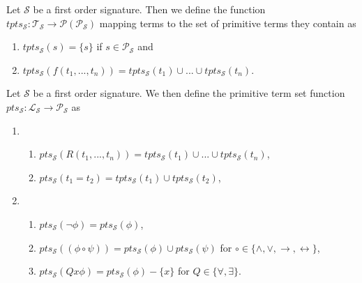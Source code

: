 \begin{definition}%
    Let $\mathcal{S}$ be a first order signature. Then we define the function $tpts_{\mathcal{S}} : \mathcal{T}_{\mathcal{S}} \to \mathcal{P}(\mathcal{P}_{\mathcal{S}})$ mapping terms to the set of primitive terms they contain as
    \begin{enumerate}
        \item $tpts_{\mathcal{S}}(s) = \{s\}$ if $s \in \mathcal{P}_{\mathcal{S}}$ and
        \item $tpts_{\mathcal{S}}(f(t_1,...,t_n)) = tpts_{\mathcal{S}}(t_1)\cup ... \cup tpts_{\mathcal{S}}(t_n)$.
    \end{enumerate}
\end{definition}

\begin{definition}%
    Let $\mathcal{S}$ be a first order signature. We then define the primitive term set function $pts_{\mathcal{S}} : \mathcal{L}_{\mathcal{S}} \to \mathcal{P}_{\mathcal{S}}$ as 
    \begin{enumerate}
        \item \begin{enumerate}
            \item $pts_{\mathcal{S}}(R(t_1,...,t_n)) = tpts_{\mathcal{S}}(t_1) \cup ... \cup tpts_{\mathcal{S}}(t_n)$,
            \item $pts_{\mathcal{S}}(t_1 = t_2) = tpts_{\mathcal{S}}(t_1) \cup tpts_{\mathcal{S}}(t_2)$,
        \end{enumerate}
        \item \begin{enumerate}
            \item $pts_{\mathcal{S}}(\neg \phi) = pts_{\mathcal{S}}(\phi)$,
            \item $pts_{\mathcal{S}}((\phi \circ \psi)) = pts_{\mathcal{S}}(\phi) \cup pts_{\mathcal{S}}(\psi)$ for $\circ \in \{\land, \lor, \to, \leftrightarrow\}$,
            \item $pts_{\mathcal{S}}(Qx\phi) = pts_{\mathcal{S}}(\phi) - \{x\}$ for $Q \in \{\forall, \exists\}$.
        \end{enumerate}
    \end{enumerate}
\end{definition}

